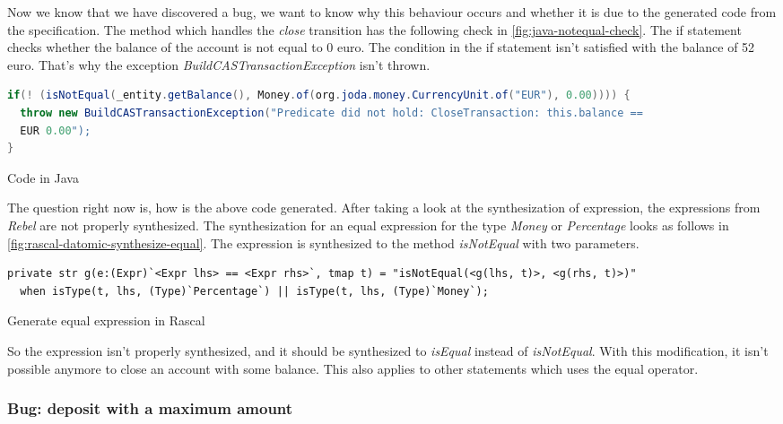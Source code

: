 Now we know that we have discovered a bug, we want to know why this behaviour
occurs and whether it is due to the generated code from the specification. The
method which handles the \textit{close} transition has the following check in
\autoref{fig:java-notequal-check}. The if statement checks whether the balance
of the account is not equal to 0 euro. The condition in the if statement isn't
satisfied with the balance of 52 euro. That's why the exception
\textit{BuildCASTransactionException} isn't thrown.

\begin{sourcecode}[h!]
\begin{lstlisting}[language=Java]
if(! (isNotEqual(_entity.getBalance(), Money.of(org.joda.money.CurrencyUnit.of("EUR"), 0.00)))) {
  throw new BuildCASTransactionException("Predicate did not hold: CloseTransaction: this.balance ==
  EUR 0.00");
}
\end{lstlisting}
\caption{Code in Java}\label{fig:java-notequal-check}
\end{sourcecode}
\FloatBarrier

The question right now is, how is the above code generated. After taking a look at the synthesization of
expression, the expressions from \textit{Rebel} are not properly synthesized. The
synthesization for an equal expression for the type \textit{Money} or \textit{Percentage} looks as
follows in \autoref{fig:rascal-datomic-synthesize-equal}. The expression is
synthesized to the method \textit{isNotEqual} with two parameters.

\begin{sourcecode}[h!]
\begin{lstlisting}[]
private str g(e:(Expr)`<Expr lhs> == <Expr rhs>`, tmap t) = "isNotEqual(<g(lhs, t)>, <g(rhs, t)>)"
  when isType(t, lhs, (Type)`Percentage`) || isType(t, lhs, (Type)`Money`);
\end{lstlisting}
\caption{Generate equal expression in Rascal}\label{fig:rascal-datomic-synthesize-equal}
\end{sourcecode}
\FloatBarrier

So the expression isn't properly synthesized, and it should be synthesized to
\textit{isEqual} instead of \textit{isNotEqual}. With this modification, it
isn't possible anymore to close an account with some balance. This also applies
to other statements which uses the equal operator.

\subsubsection{Bug: deposit with a maximum amount}\label{sec:bug-compile-max-deposit}

